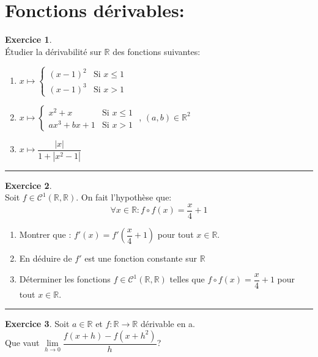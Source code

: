 \documentclass[a4paper,10pt]{article}
\theoremstyle{definition}
\theoremstyle{definition}
\newtheorem{exo}{Exercice}
\newcommand{\R}{\mathbb{R}}
\begin{document}
\section*{Fonctions dérivables:}
\begin{minipage}{1\linewidth}
\begin{minipage}[t]{0.48\linewidth}
\raggedright

\begin{exo}\quad\\
Étudier la dérivabilité sur $\R$ des fonctions suivantes:
\begin{enumerate}
\item$x \longmapsto\left\{\begin{array}{cl}
(x-1)^2 & \text{Si } x\leq 1\\
(x-1)^3 & \text{Si } x> 1
\end{array}\right.$
\item $x \longmapsto\left\{\begin{array}{cl}
x^2+x & \text{Si } x\leq 1\\
ax^3+bx + 1 & \text{Si } x> 1
\end{array}\right.$  , $(a,b)\in\R^2$
\item $x \longmapsto \dfrac{|x|}{1 + |x^2-1|}$
\end{enumerate}
\centering\rule{1\linewidth}{0.6pt}
\end{exo}

\begin{exo}\quad\\
\noindent Soit $f\in\mathcal{C}^1\left(\R,\R\right)$. On fait l'hypothèse que:
 $$\forall x\in\R : f\circ f\left(x\right) = \dfrac{x}{4} +1$$
 \begin{enumerate}
\item Montrer que : $f'(x) = f'\left( \dfrac{x}{4} +1\right)  $ pour tout $x\in\R$.
\item En déduire de $f'$ est une fonction constante sur $\R$
\item Déterminer les fonctions $f\in\mathcal{C}^1\left(\R,\R\right)$ telles que $f\circ f\left(x\right) = \dfrac{x}{4} +1$ pour tout $x\in\R$.
 \end{enumerate}
\centering
\rule{1\linewidth}{0.6pt}
\end{exo}

\begin{exo}
Soit $a\in\R$ et $f:\R\rightarrow\R$ dérivable en a. \\
Que vaut $\lim\limits_{h\rightarrow 0}\dfrac{f(x+h)- f(x+h^2)}{h}$?


\end{exo}
\end{minipage}
\end{minipage}
\end{document}
